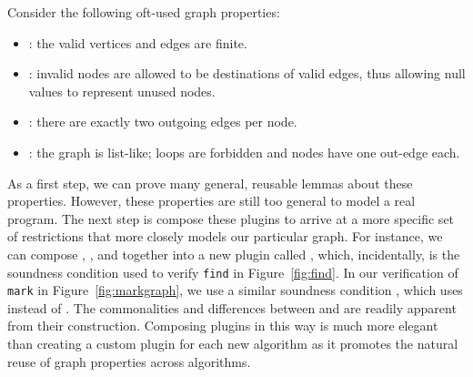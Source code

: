 Consider the following oft-used graph properties:
\begin{itemize}
\vspace{-1ex}
\item {}: the valid vertices and edges are finite.
\item {}: invalid nodes are allowed to be destinations
of valid edges, thus allowing null values to represent unused nodes.
\item {}: there are exactly two outgoing edges per node. 
\item {}: the graph is list-like; loops are forbidden and 
nodes have one out-edge each.
\end{itemize}

As a first step, we can prove many general, reusable lemmas
about these properties. However, these properties are still 
too general to model a real program. The next step is compose 
these plugins to arrive at a more specific set of restrictions 
that more closely models our particular graph. 
For instance, we can compose 
, , and  
together into a new plugin called , which, incidentally, is
the soundness condition used to verify \texttt{find} in
Figure~\ref{fig:find}.  In our verification of \texttt{mark} in
Figure~\ref{fig:markgraph}, we use a similar soundness condition
, which uses  instead of . 
The commonalities and differences between  
and  are readily apparent from their construction.
Composing plugins in this way is much more elegant than creating a
custom plugin for each new algorithm as it promotes the natural reuse of graph 
properties across algorithms.

\iffalse
\marginpar{\tiny \color{blue} Maybe move this somewhere.} 
{\color{magenta}Coq also handles our notion of inherited 
lemmas seamlessly: in our verfication of Find, we 
work directly with a \p{LiMaFin} GeneralGraph, but, as 
we saw, we still use properties such as reachability 
and operations such as selective subtraction, which are defined on the 
embedded PreGraph, not the GeneralGraph. 
Coq handles the appropriate coercions with 
remarkable elegance.}
\fi


